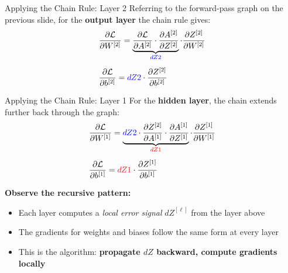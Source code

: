 \documentclass[11pt,aspectratio=169,professionalfonts]{beamer}
\begin{document}
%
%
\begin{frame}{Applying the Chain Rule: Layer 2}
Referring to the forward-pass graph on the previous slide, for the \textbf{output layer} the chain rule gives:
\begin{align*}
&\frac{\partial \mathcal{L}}{\partial W^{[2]}} = \underbrace{\frac{\partial \mathcal{L}}{\partial A^{[2]}} \cdot \frac{\partial A^{[2]}}{\partial Z^{[2]}}}_{\textcolor{blue}{dZ2}} \cdot \frac{\partial Z^{[2]}}{\partial W^{[2]}}
\\[0.5em]
&\frac{\partial \mathcal{L}}{\partial b^{[2]}} = \textcolor{blue}{dZ2} \cdot \frac{\partial Z^{[2]}}{\partial b^{[2]}}
\end{align*}
\end{frame}
%
%
\begin{frame}{Applying the Chain Rule: Layer 1}
For the \textbf{hidden layer}, the chain extends further back through the graph:
\begin{align*}
&\frac{\partial \mathcal{L}}{\partial W^{[1]}} = \underbrace{\textcolor{blue}{dZ2} \cdot \frac{\partial Z^{[2]}}{\partial A^{[1]}} \cdot \frac{\partial A^{[1]}}{\partial Z^{[1]}}}_{\textcolor{red}{dZ1}} \cdot \frac{\partial Z^{[1]}}{\partial W^{[1]}}
\\[0.5em]
&\frac{\partial \mathcal{L}}{\partial b^{[1]}} = \textcolor{red}{dZ1} \cdot \frac{\partial Z^{[1]}}{\partial b^{[1]}}
\end{align*}

\medskip
\textbf{Observe the recursive pattern:}
\begin{itemize}
\item Each layer computes a \textit{local error signal} $dZ^{[\ell]}$ from the layer above
\item The gradients for weights and biases follow the same form at every layer
\item This is the algorithm: \textbf{propagate $dZ$ backward, compute gradients locally}
\end{itemize}
\end{frame}
%
%
\end{document}
